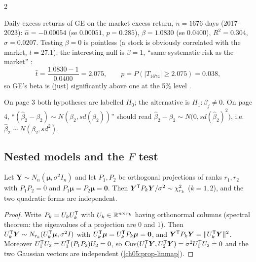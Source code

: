 \begin{paracol}{2}
\begin{example}\label{ch05:ex-gebeta}
Daily excess returns of GE on the market excess return, $n=1676$ days (2017--2023): $\hat\alpha=-0.00054$ (se
$0.00051$, $p=0.285$), $\hat\beta=1.0830$ (se $0.0400$), $R^2=0.304$, $\hat\sigma=0.0207$. Testing $\beta=0$ is pointless
(a stock is obviously correlated with the market, $t=27.1$); the interesting null is $\beta=1$, ``same systematic
risk as the market'' :
\[
  \hat t=\frac{1.0830-1}{0.0400}=2.075,\qquad p=P(|T_{1674}|\ge2.075)=0.038,
\]
so GE's beta is (just) significantly above one at the 5\% level .
\end{example}

\begin{coursenote}
On page 3 both hypotheses are labelled $H_0$; the alternative is $H_1:\beta_j\neq0$. On page 4,
``$(\hat\beta_2-\beta_2)\sim N(\beta_2,sd(\hat\beta_2))$'' should read $\hat\beta_2-\beta_2\sim N\bigl(0,sd(\hat\beta_2)^2\bigr)$, i.e.\
$\hat\beta_2\sim N(\beta_2,sd^2)$.
\end{coursenote}

\subsection{Nested models and the \texorpdfstring{$F$}{F} test}
\begin{lemma}\label{ch05:lem-proj}
Let $\bm Y\sim N_n(\bm\mu,\sigma^2I_n)$ and let $P_1,P_2$ be orthogonal projections of ranks $r_1,r_2$ with $P_1P_2=0$ and
$P_1\bm\mu=P_2\bm\mu=\bm 0$. Then $\bm Y^{\mathsf T} P_k\bm Y/\sigma^2\sim\chi^2_{r_k}$ ($k=1,2$), and the two quadratic forms are independent.
\end{lemma}
\begin{proof}
Write $P_k=U_kU_k^{\mathsf T}$ with $U_k\in\mathbb{R}^{n\times r_k}$ having orthonormal columns (spectral theorem: the eigenvalues of a
projection are $0$ and $1$). Then $U_k^{\mathsf T}\bm Y\sim N_{r_k}(U_k^{\mathsf T}\bm\mu,\sigma^2I)$ with $U_k^{\mathsf T}\bm\mu=U_k^{\mathsf T} P_k\bm\mu=\bm 0$, and
$\bm Y^{\mathsf T} P_k\bm Y=\|U_k^{\mathsf T}\bm Y\|^2$. Moreover $U_1^{\mathsf T} U_2=U_1^{\mathsf T}(P_1P_2)U_2=0$, so $\operatorname{Cov}(U_1^{\mathsf T}\bm Y,U_2^{\mathsf T}\bm Y)=\sigma^2U_1^{\mathsf T} U_2=0$ and
the two Gaussian vectors are independent (\cref{ch05:prop-linmap}).
\end{proof}


\end{paracol}
